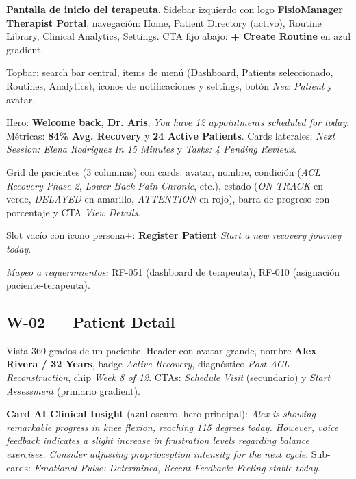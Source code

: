 \textbf{Pantalla de inicio del terapeuta}. Sidebar izquierdo  con logo \textbf{FisioManager Therapist Portal}, navegación: Home, Patient Directory (activo), Routine Library, Clinical Analytics, Settings. CTA fijo abajo: \textbf{+ Create Routine} en azul gradient.

Topbar: search bar central, ítems de menú (Dashboard, Patients seleccionado, Routines, Analytics), iconos de notificaciones y settings, botón \textit{New Patient} y avatar.

Hero: \textbf{Welcome back, Dr. Aris}, \textit{You have 12 appointments scheduled for today}. Métricas: \textbf{84\% Avg. Recovery} y \textbf{24 Active Patients}. Cards laterales: \textit{Next Session: Elena Rodriguez In 15 Minutes} y \textit{Tasks: 4 Pending Reviews}.

Grid de pacientes (3 columnas) con cards: avatar, nombre, condición (\textit{ACL Recovery Phase 2}, \textit{Lower Back Pain Chronic}, etc.), estado (\textit{ON TRACK} en verde, \textit{DELAYED} en amarillo, \textit{ATTENTION} en rojo), barra de progreso con porcentaje y CTA \textit{View Details}.

Slot vacío con icono persona+: \textbf{Register Patient} \textit{Start a new recovery journey today}.

\textit{Mapeo a requerimientos:} RF-051 (dashboard de terapeuta), RF-010 (asignación paciente-terapeuta).


\subsection{W-02 --- Patient Detail}

Vista 360 grados de un paciente. Header con avatar grande, nombre \textbf{Alex Rivera / 32 Years}, badge \textit{Active Recovery}, diagnóstico \textit{Post-ACL Reconstruction}, chip \textit{Week 8 of 12}. CTAs: \textit{Schedule Visit} (secundario) y \textit{Start Assessment} (primario gradient).

\textbf{Card AI Clinical Insight} (azul oscuro, hero principal): \textit{Alex is showing remarkable progress in knee flexion, reaching 115 degrees today. However, voice feedback indicates a slight increase in frustration levels regarding balance exercises. Consider adjusting proprioception intensity for the next cycle}. Sub-cards: \textit{Emotional Pulse: Determined}, \textit{Recent Feedback: Feeling stable today}.

